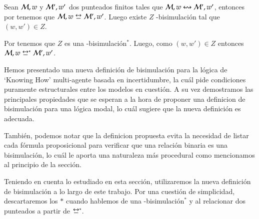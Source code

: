 \begin{demostracion}
    Sean $\mathcal{M},w$ y $\mathcal{M}',w'$ dos \ultss punteados finitos tales que $\mathcal{M},w \mathrel{\leftrightsquigarrow} \mathcal{M}', w'$, entonces por 
    tenemos que $\model,w \bisim \model', w'$. Luego existe $Z$ \KHilogic-bisimulación tal que $(w,w') \in Z$.

    Por  tenemos que $Z$ es una \KHilogic-bisimulación$^*$. Luego, como $(w,w') \in Z$ 
    entonces $\model,w \bisim^* \model', w'$.
\end{demostracion}

Hemos presentado una nueva definición de bisimulación para la lógica de `Knowing How' multi-agente basada en incertidumbre, la 
cuál pide condiciones puramente estructurales entre los modelos en cuestión. A su vez demostramos las principales propiedades que se 
esperan a la hora de proponer una definicion de bisimulación para una lógica modal, lo cuál sugiere que la nueva definición es adecuada.

También, podemos notar que la definicion propuesta evita la necesidad de listar cada fórmula proposicional para verificar que una relación binaria
es una bisimulación, lo cuál le aporta una naturaleza más procedural como mencionamos al principio de la sección.  

Teniendo en cuenta lo estudiado en esta sección, utilizaremos la nueva definición de bisimulación a lo largo de este trabajo.
Por una cuestión de simplicidad, descartaremos los $*$ cuando hablemos de una \KHilogic-bisimulación$^*$ y 
al relacionar dos \ultss punteados a partir de $\bisim^*$.